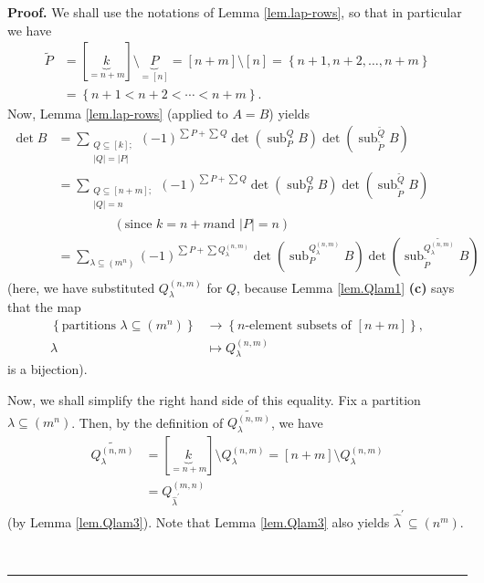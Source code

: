 \documentclass[numbers=enddot,12pt,final,onecolumn,notitlepage]{scrartcl}%
\theoremstyle{definition}
\newenvironment{proof}[1][Proof]{\noindent\textbf{#1.} }{\ \rule{0.5em}{0.5em}}
\let\sumnonlimits\sum
\renewcommand{\sum}{\sumnonlimits\limits}
\begin{document}
\begin{enumerate}
\begin{proof}
We shall use the notations of Lemma \ref{lem.lap-rows}, so that in particular
we have
\begin{align*}
\widetilde{P}  &  =\left[  \underbrace{k}_{=n+m}\right]  \setminus
\underbrace{P}_{=\left[  n\right]  }=\left[  n+m\right]  \setminus\left[
n\right]  =\left\{  n+1,n+2,\ldots,n+m\right\} \\
&  =\left\{  n+1<n+2<\cdots<n+m\right\}  .
\end{align*}
Now, Lemma \ref{lem.lap-rows} (applied to $A=B$) yields
\begin{align*}
\det B  &  =\sum_{\substack{Q\subseteq\left[  k\right]  ;\\\left\vert
Q\right\vert =\left\vert P\right\vert }}\left(  -1\right)  ^{\sum P+\sum
Q}\det\left(  \operatorname*{sub}\nolimits_{P}^{Q}B\right)  \det\left(
\operatorname*{sub}\nolimits_{\widetilde{P}}^{\widetilde{Q}}B\right) \\
&  =\sum_{\substack{Q\subseteq\left[  n+m\right]  ;\\\left\vert Q\right\vert
=n}}\left(  -1\right)  ^{\sum P+\sum Q}\det\left(  \operatorname*{sub}%
\nolimits_{P}^{Q}B\right)  \det\left(  \operatorname*{sub}%
\nolimits_{\widetilde{P}}^{\widetilde{Q}}B\right) \\
&  \ \ \ \ \ \ \ \ \ \ \ \ \ \ \ \ \ \ \ \ \left(  \text{since }k=n+m\text{
and }\left\vert P\right\vert =n\right) \\
&  =\sum_{\lambda\subseteq\left(  m^{n}\right)  }\left(  -1\right)  ^{\sum
P+\sum Q_{\lambda}^{\left(  n,m\right)  }}\det\left(  \operatorname*{sub}%
\nolimits_{P}^{Q_{\lambda}^{\left(  n,m\right)  }}B\right)  \det\left(
\operatorname*{sub}\nolimits_{\widetilde{P}}^{\widetilde{Q_{\lambda}^{\left(
n,m\right)  }}}B\right)
\end{align*}
(here, we have substituted $Q_{\lambda}^{\left(  n,m\right)  }$ for $Q$,
because Lemma \ref{lem.Qlam1} \textbf{(c)} says that the map%
\begin{align*}
\left\{  \text{partitions }\lambda\subseteq\left(  m^{n}\right)  \right\}   &
\rightarrow\left\{  n\text{-element subsets of }\left[  n+m\right]  \right\}
,\\
\lambda &  \mapsto Q_{\lambda}^{\left(  n,m\right)  }%
\end{align*}
is a bijection).

Now, we shall simplify the right hand side of this equality. Fix a partition
$\lambda\subseteq\left(  m^{n}\right)  $. Then, by the definition of
$\widetilde{Q_{\lambda}^{\left(  n,m\right)  }}$, we have%
\begin{align}
\widetilde{Q_{\lambda}^{\left(  n,m\right)  }}  &  =\left[  \underbrace{k}%
_{=n+m}\right]  \setminus Q_{\lambda}^{\left(  n,m\right)  }=\left[
n+m\right]  \setminus Q_{\lambda}^{\left(  n,m\right)  }\nonumber\\
&  =Q_{\widehat{\lambda}^{\prime}}^{\left(  m,n\right)  }
\label{p20.claim.pf.l1}%
\end{align}
(by Lemma \ref{lem.Qlam3}). Note that Lemma \ref{lem.Qlam3} also yields
$\widehat{\lambda}^{\prime}\subseteq\left(  n^{m}\right)  $.


\end{proof}
\end{enumerate}
\end{document}
